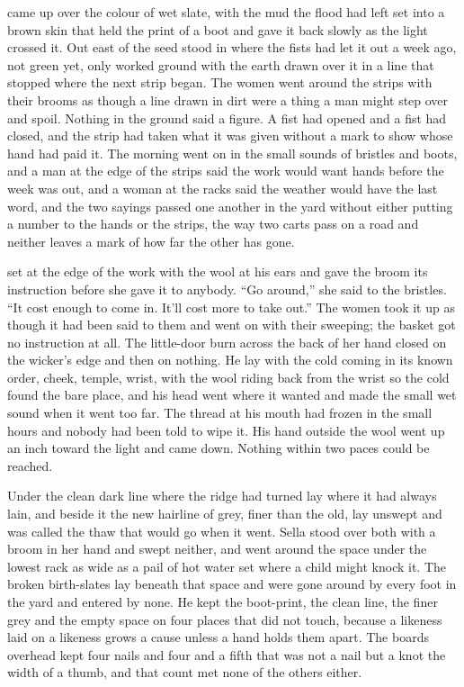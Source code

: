 
 came up over  the colour of wet slate, with the mud the flood had left set into a brown skin that held the print of a boot and gave it back slowly as the light crossed it. Out east of  the seed stood in  where the fists had let it out a week ago, not green yet, only worked ground with the earth drawn over it in a line that stopped where the next strip began. The women went around the strips with their brooms as though a line drawn in dirt were a thing a man might step over and spoil. Nothing in the ground said a figure. A fist had opened and a fist had closed, and the strip had taken what it was given without a mark to show whose hand had paid it. The morning went on in the small sounds of bristles and boots, and a man at the edge of the strips said the work would want hands before the week was out, and a woman at the racks said the weather would have the last word, and the two sayings passed one another in the yard without either putting a number to the hands or the strips, the way two carts pass on a road and neither leaves a mark of how far the other has gone.

 set  at the edge of the work with the wool at his ears and gave the broom its instruction before she gave it to anybody. “Go around,” she said to the bristles. “It cost enough to come in. It'll cost more to take out.” The women took it up as though it had been said to them and went on with their sweeping; the basket got no instruction at all. The little-door burn across the back of her hand closed on the wicker's edge and then on nothing. He lay with the cold coming in its known order, cheek, temple, wrist, with the wool riding back from the wrist so the cold found the bare place, and his head went where it wanted and made the small wet sound when it went too far. The thread at his mouth had frozen in the small hours and nobody had been told to wipe it. His hand outside the wool went up an inch toward the light and came down. Nothing within two paces could be reached.

Under  the clean dark line where the  ridge had turned lay where it had always lain, and beside it the new hairline of grey, finer than the old, lay unswept and was called the thaw that would go when it went. Sella stood over both with a broom in her hand and swept neither, and went around the space under the lowest rack as wide as a pail of hot water set where a child might knock it. The broken birth-slates lay beneath that space and were gone around by every foot in the yard and entered by none. He kept the boot-print, the clean line, the finer grey and the empty space on four places that did not touch, because a likeness laid on a likeness grows a cause unless a hand holds them apart. The boards overhead kept four nails and four and a fifth that was not a nail but a knot the width of a thumb, and that count met none of the others either.

